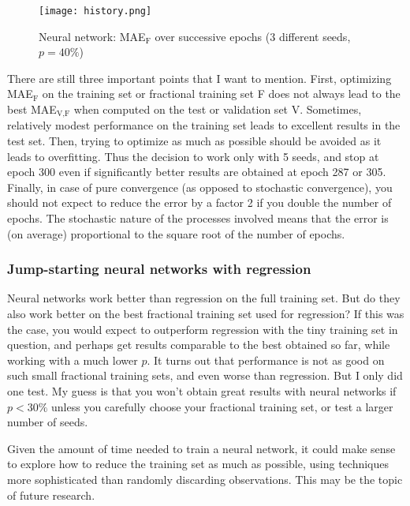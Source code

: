 \documentclass[oneside,10pt]{book}
\begin{document}
\begin{figure}[H]
\centering
\texttt{[image: history.png]}  
\caption{Neural network: MAE$_{\text{F}}$ over successive epochs (3 different seeds, $p=40\%$)} 
\label{fig:lo09bre76}
\end{figure}

There are still three important points that I want to mention. First, optimizing MAE$_{\text{F}}$ on the training set or fractional training set F does not always lead to the best MAE$_{\text{V,F}}$ when computed on the test or validation set V. Sometimes, relatively modest performance on the training set leads to excellent results in the test set.
 Then, trying to optimize as much as possible should be avoided as it leads to overfitting. Thus the decision to work only with 5 seeds, and stop at epoch 300 even if significantly better results are obtained at epoch 287 or 305. Finally, in case of pure convergence (as opposed to stochastic convergence), you should not expect to reduce the error by a factor 2 if you double the number of epochs.
 The stochastic nature of the processes involved means that the error is (on average) proportional to the square root of the number of epochs.



\subsubsection{Jump-starting neural networks with regression} 

Neural networks work better than regression on the full training set. But do they also work better on the best fractional training set used for regression? If this was the case,
  you would expect to outperform regression with the tiny training set in question, and perhaps get results comparable to the best obtained so far, while working
 with a much lower $p$. It turns out that performance is not as good on such small fractional training sets, and even worse than regression. But I only did one test. My guess is that you won't obtain great results with neural networks if $p<30\%$ unless you carefully choose your fractional training set, or test a larger number of seeds. 

Given the amount of time needed to train a neural network, it could make sense to explore how to reduce the training set as much as possible, using techniques
 more sophisticated than randomly discarding observations. This may be the topic of future research. 
\end{document}
